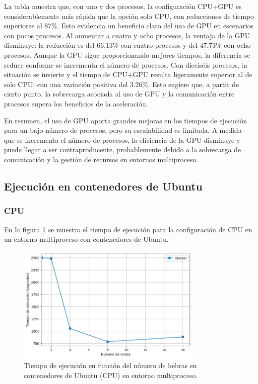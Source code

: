 La tabla muestra que, con uno y dos procesos, la configuración CPU+GPU es considerablemente más rápida que la opción solo CPU, con reducciones de tiempo superiores al 87\%. Esto evidencia un beneficio claro del uso de GPU en escenarios con pocos procesos. Al aumentar a cuatro y ocho procesos, la ventaja de la GPU disminuye: la reducción es del 66.13\% con cuatro procesos y del 47.73\% con ocho procesos. Aunque la GPU sigue proporcionando mejores tiempos, la diferencia se reduce conforme se incrementa el número de procesos. Con dieciséis procesos, la situación se invierte y el tiempo de CPU+GPU resulta ligeramente superior al de solo CPU, con una variación positiva del 3.26\%. Esto sugiere que, a partir de cierto punto, la sobrecarga asociada al uso de GPU y la comunicación entre procesos supera los beneficios de la aceleración.

En resumen, el uso de GPU aporta grandes mejoras en los tiempos de ejecución para un bajo número de procesos, pero su escalabilidad es limitada. A medida que se incrementa el número de procesos, la eficiencia de la GPU disminuye y puede llegar a ser contraproducente, probablemente debido a la sobrecarga de comunicación y la gestión de recursos en entornos multiproceso.

\subsection{Ejecución en contenedores de Ubuntu}
\subsubsection{CPU}

En la figura \ref{fig:multi-node_ubuntu_docker_time} se muestra el tiempo de ejecución para la configuración de CPU en un entorno multiproceso con contenedores de Ubuntu.

\begin{figure}[ht]
    \centering
    \includegraphics[width=0.8\textwidth]{imagenes/cap5/multi-node_ubuntu_docker_time.png}
    \caption{Tiempo de ejecución en función del número de hebras en contenedores de Ubuntu (CPU) en entorno multiproceso.}
    \label{fig:multi-node_ubuntu_docker_time}
\end{figure}

